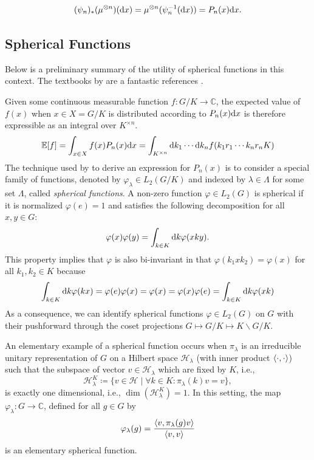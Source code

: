 \documentclass[notitlepage]{article}
\begin{document}
\begin{equation}
    (\psi_n)_{*}(\mu^{\otimes n})(\mathrm{d} x) = \mu^{\otimes n}(\psi_n^{-1}(\mathrm{d} x)) = P_n(x)\mathrm{d} x.
\end{equation}

\subsection{Spherical Functions}

Below is a preliminary summary of the utility of spherical functions in this context.
The textbooks by \citeauthor{helgason1994geometric} are a fantastic references \cite{helgason1984groups,helgason1994geometric}. 

Given some continuous measurable function $f : G/K \to \mathbb C$, the expected value of $f(x)$ when $x \in X = G/K$ is distributed according to $P_n(x) \mathrm{d} x$ is therefore expressible as an integral over $K^{\times n}$.
\begin{equation}
    \mathbb E [ f ] = \int_{x \in X} f(x) P_n(x)\mathrm{d} x = \int_{K^{\times n}} \mathrm{d} k_1 \cdots \mathrm{d} k_n f(k_1r_1\cdots k_nr_nK)
\end{equation}
The technique used by \citeauthor{klyachko2000random} to derive an expression for $P_n(x)$ is to consider a special family of functions, denoted by $\varphi_{\lambda} \in L_{2}(G/K)$ and indexed by $\lambda \in \Lambda$ for some set $\Lambda$, called \textit{spherical functions}.
A non-zero function $\varphi \in L_{2}(G)$ is spherical if it is normalized $\varphi(e) = 1$ and satisfies the following decomposition for all $x, y \in G$:
\begin{equation}
    \varphi(x)\varphi(y) = \int_{k \in K} \mathrm{d} k \varphi(x k y).
\end{equation}
This property implies that $\varphi$ is also bi-invariant in that $\varphi(k_1 x k_2) = \varphi(x)$ for all $k_1,k_2\in K$ because
\begin{equation}
    \int_{k \in K} \mathrm{d} k \varphi(k x) = \varphi(e)\varphi(x) = \varphi(x) = \varphi(x)\varphi(e) = \int_{k \in K} \mathrm{d} k \varphi(x k)
\end{equation}
As a consequence, we can identify spherical functions $\varphi \in L_{2}(G)$ on $G$ with their pushforward through the coset projections $G \mapsto G/K \mapsto K\backslash G/ K$.

An elementary example of a spherical function occurs when $\pi_{\lambda}$ is an irreducible unitary representation of $G$ on a Hilbert space $\mathcal H_{\lambda}$ (with inner product $\braket{\cdot, \cdot}$) such that the subspace of vector $v \in \mathcal H_{\lambda}$ which are fixed by $K$, i.e.,
\begin{equation}
    \mathcal H_{\lambda}^{K} \coloneqq \{v \in \mathcal H \mid \forall k \in K : \pi_{\lambda}(k) v = v \},
\end{equation}
is exactly one dimensional, i.e., $\dim(\mathcal H_{\lambda}^{K}) = 1$.
In this setting, the map $\varphi_{\lambda} : G \to \mathbb C$, defined for all $g \in G$ by
\begin{equation}
    \varphi_{\lambda}(g) = \frac{\braket{v, \pi_{\lambda}(g) v}}{\braket{v,v}}
\end{equation}
is an elementary spherical function.
\end{document}
